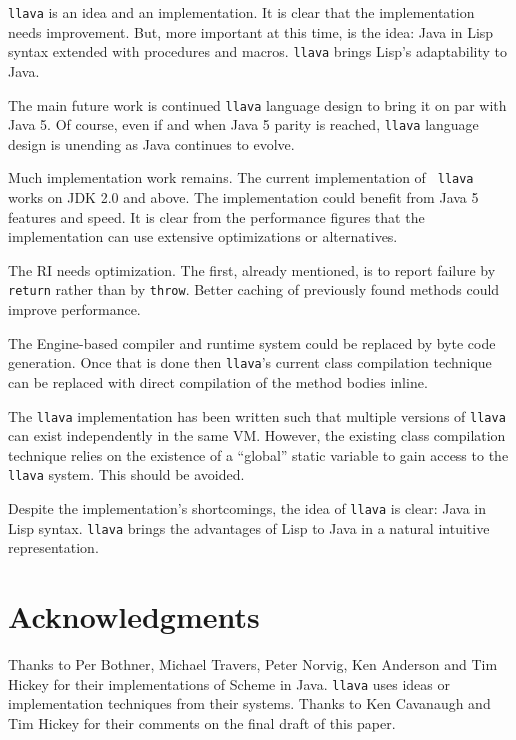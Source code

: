 \documentclass[final]{ieee}
\begin{document}
{\tt llava} is an idea and an implementation.  It is clear that the
implementation needs improvement.  But, more important at this time,
is the idea: Java in Lisp syntax extended with procedures and macros.
{\tt llava} brings Lisp's adaptability to Java.

The main future work is continued {\tt llava} language design to bring
it on par with Java 5.  Of course, even if and when Java 5 parity is
reached, {\tt llava} language design is unending as Java continues to
evolve.

Much implementation work remains.  The current implementation of {\tt
llava} works on JDK 2.0 and above.  The implementation could benefit
from Java 5 features and speed.  It is clear from the performance
figures that the implementation can use extensive optimizations or
alternatives.

The RI needs optimization.  The first, already mentioned, is to report
failure by {\tt return} rather than by {\tt throw}.  Better caching of
previously found methods could improve performance.

The Engine-based compiler and runtime system could be replaced by byte
code generation.  Once that is done then {\tt llava}'s current class
compilation technique can be replaced with direct compilation of the
method bodies inline.  

The {\tt llava} implementation has been written such
that multiple versions of {\tt llava} can exist independently in the
same VM.  However, the existing class compilation technique relies on the
existence of a ``global'' static variable to gain access to the {\tt
llava} system.  This should be avoided.

Despite the implementation's shortcomings, the idea of {\tt llava} is
clear: Java in Lisp syntax.  {\tt llava} brings the advantages of Lisp
to Java in a natural intuitive representation.


\section{Acknowledgments}

Thanks to Per Bothner, Michael Travers, Peter Norvig, Ken Anderson and
Tim Hickey for their implementations of Scheme in Java.  {\tt llava}
uses ideas or implementation techniques from their systems.  Thanks to
Ken Cavanaugh and Tim Hickey for their comments on the final draft of
this paper.
\end{document}
